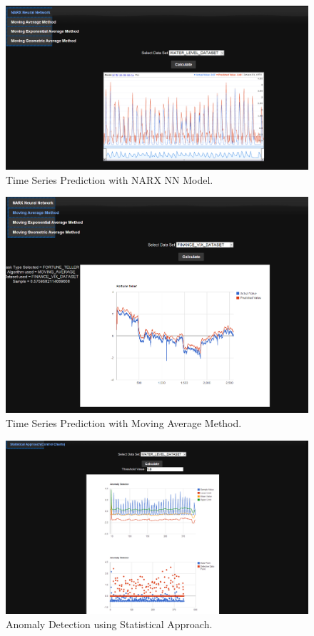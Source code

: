 \documentclass[12pt,a4paper]{report}
\begin{document}
\begin{figure}[h!]
  
  \centering
    \includegraphics[scale=0.40]{./screenshots/ft_narx.png}
\caption{Time Series Prediction with NARX NN Model.}
\end{figure}
\begin{figure}[h!]
  
  \centering
    \includegraphics[scale=0.400]{./screenshots/ft_mv_avg.png}
\caption{Time Series Prediction with Moving Average Method.}
\end{figure}

\begin{figure}[h!]
  
  \centering
    \includegraphics[scale=0.350]{./screenshots/ano_stat_app.png}
\caption{Anomaly Detection using Statistical Approach.}
\end{figure}
\end{document}
